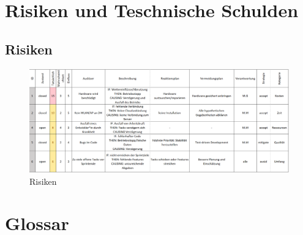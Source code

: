 \documentclass[
]{article}
\begin{document}
\section{Risiken und Teschnische Schulden}
\subsection{Risiken}
\begin{figure}[htbp]
	\centering
	\includegraphics[width=180mm]{resources/Risiken.png}
	\caption{Risiken}
	\label{fig:Risiken}
\end{figure}  

\section{Glossar}
\end{document}
